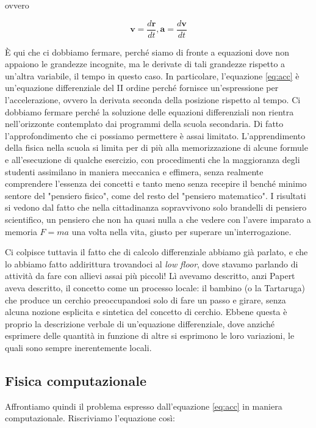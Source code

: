 ovvero

\begin{equation}
\mathbf{v}=\frac{d\mathbf{r}}{dt},\mathbf{a}=\frac{d\mathbf{v}}{dt}
\end{equation}

È qui che ci dobbiamo fermare, perché siamo di fronte a equazioni dove non appaiono le grandezze incognite, ma le derivate di tali grandezze rispetto a un'altra variabile, il tempo in questo caso. In particolare, l'equazione \ref{eq:acc} è un'equazione differenziale del II ordine perché fornisce un'espressione per l'accelerazione, ovvero la derivata seconda della posizione rispetto al tempo.  Ci dobbiamo fermare perché la soluzione delle equazioni differenziali non rientra nell'orizzonte contemplato dai programmi della scuola secondaria. Di fatto l'approfondimento che ci possiamo permettere è assai limitato. L'apprendimento della fisica nella scuola si limita per di più alla memorizzazione di alcune formule e all'esecuzione di qualche esercizio, con procedimenti che la maggioranza degli studenti assimilano in maniera meccanica e effimera, senza realmente comprendere l'essenza dei concetti e tanto meno senza recepire il benché minimo sentore del "pensiero fisico", come del resto del "pensiero matematico". I risultati si vedono dal fatto che nella cittadinanza sopravvivono solo brandelli di pensiero scientifico, un pensiero che non ha quasi nulla a che vedere con l'avere imparato a memoria $F=ma$ una volta nella vita, giusto per superare un'interrogazione.

Ci colpisce tuttavia il fatto che di calcolo differenziale abbiamo già parlato, e che lo abbiamo fatto addirittura trovandoci al \textit{low floor}, dove stavamo parlando di attività da fare con allievi assai più piccoli! Lì avevamo descritto, anzi Papert aveva descritto, il concetto come un processo locale: il bambino (o la Tartaruga) che produce un cerchio preoccupandosi solo di fare un passo e girare, senza alcuna nozione esplicita e sintetica del concetto di cerchio. Ebbene questa è proprio la descrizione verbale di un'equazione differenziale, dove anziché esprimere delle quantità in funzione di altre si esprimono le loro variazioni, le quali sono sempre inerentemente locali.

\subsection{Fisica computazionale}

Affrontiamo quindi il problema espresso dall'equazione \ref{eq:acc} in maniera computazionale.  Riscriviamo l'equazione così:

